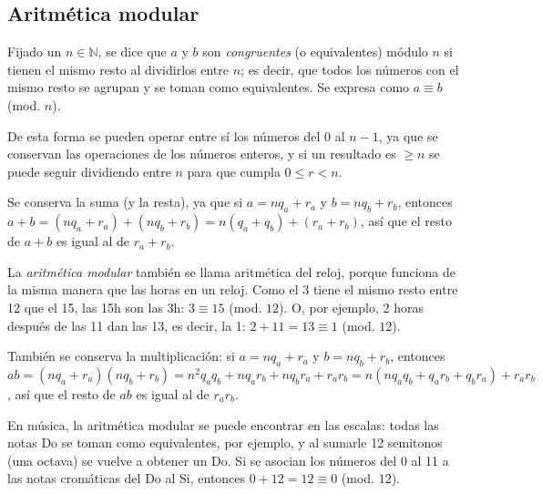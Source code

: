 	\subsection{Aritm\'etica modular}
		Fijado un $n\in\mathbb{N}$, se dice que $a$ y $b$ son \textit{congruentes} (o equivalentes) m\'odulo $n$ si tienen el mismo resto al dividirlos entre $n$; es decir, que todos los n\'umeros con el mismo resto se agrupan y se toman como equivalentes. Se expresa como $a\equiv b$ (mod. $n$).
	
		De esta forma se pueden operar entre s\'i los n\'umeros del 0 al $n-1$, ya que se conservan las operaciones de los n\'umeros enteros, y si un resultado es $\geq n$ se puede seguir dividiendo entre $n$ para que cumpla $0\leq r<n$.
		
		Se conserva la suma (y la resta), ya que si $a=nq_a+r_a$ y $b=nq_b+r_b$, entonces $a+b=(nq_a+r_a)+(nq_b+r_b)=n(q_a+q_b)+(r_a+r_b)$, as\'i que el resto de $a+b$ es igual al de $r_a+r_b$.
		
		La \textit{aritm\'etica modular} tambi\'en se llama aritm\'etica del reloj, porque funciona de la misma manera que las horas en un reloj. Como el 3 tiene el mismo resto entre 12 que el 15, las 15h son las 3h: $3\equiv15$ (mod. $12$). O, por ejemplo, 2 horas despu\'es de las 11 dan las 13, es decir, la 1: $2+11=13\equiv1$ (mod. $12$). 
		
		Tambi\'en se conserva la multiplicaci\'on: si $a=nq_a+r_a$ y $b=nq_b+r_b$, entonces $ab=(nq_a+r_a)(nq_b+r_b)=n^2q_aq_b+nq_ar_b+nq_br_a+r_ar_b=n(nq_aq_b+q_ar_b+q_br_a)+r_ar_b$, as\'i que el resto de $ab$ es igual al de $r_ar_b$.
		
		En m\'usica, la aritm\'etica modular se puede encontrar en las escalas: todas las notas Do se toman como equivalentes, por ejemplo, y al sumarle 12 semitonos (una octava) se vuelve a obtener un Do. Si se asocian los n\'umeros del 0 al 11 a las notas crom\'aticas del Do al Si, entonces $0+12=12\equiv0$ (mod. $12$).
